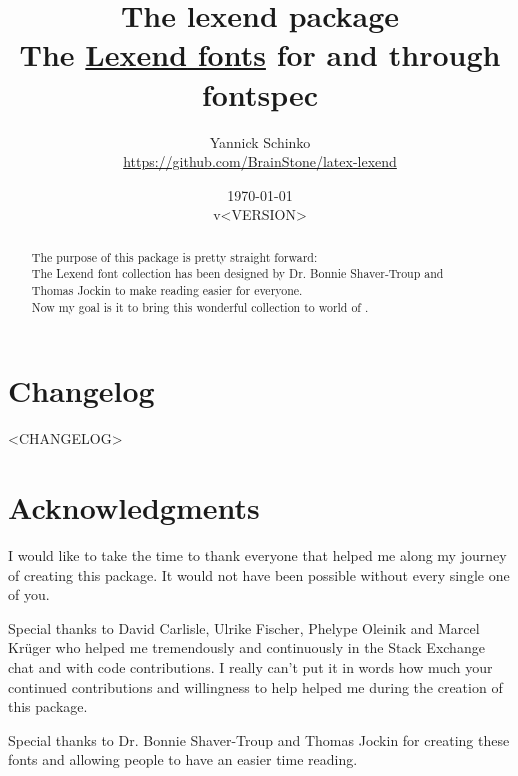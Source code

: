\documentclass[oneside,a4paper]{l3doc}
\begin{document}
\title{
	The \textsf{lexend} package\\
	\large{The \href{https://www.lexend.com/}{\textsf{Lexend} fonts} for  and
	 through \textsf{fontspec}}
}
\author{
	Yannick Schinko\\
	\texorpdfstring{\url{https://github.com/BrainStone/latex-lexend}}{}
}
\date{
	\today\\
	v<VERSION>
}

\maketitle

\bigskip

\begin{abstract}
The purpose of this package is pretty straight forward:\\
The Lexend font collection has been designed by Dr. Bonnie Shaver-Troup and Thomas Jockin to make
reading easier for everyone.\\
Now my goal is it to bring this wonderful collection to world of .
\end{abstract}

\bigskip
\tableofcontents
\newpage


\section{Changelog}

<CHANGELOG>

\section{Acknowledgments}

I would like to take the time to thank everyone that helped me along my journey of creating this
package. It would not have been possible without every single one of you.

Special thanks to David Carlisle, Ulrike Fischer, Phelype Oleinik and Marcel Krüger who helped me
tremendously and continuously in the  Stack Exchange chat and with code contributions.
I really can't put it in words how much your continued contributions and willingness to help helped
me during the creation of this package.

Special thanks to Dr. Bonnie Shaver-Troup and Thomas Jockin for creating these fonts and allowing
people to have an easier time reading.
\end{document}
